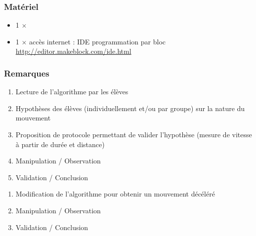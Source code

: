 \subsubsection{Matériel}
\begin{itemize}

   
    \item 1 $\times$ \matosMbot
   \item 1 $\times$ accès internet : IDE programmation par bloc \url{http://editor.makeblock.com/ide.html}
\end{itemize}

\subsubsection{Remarques}

\begin{minipage}[t]{0.5\linewidth}
\begin{methode}
    \begin{enumerate}
        \item Lecture de l'algorithme par les élèves
        \item Hypothèses des élèves (individuellement et/ou par groupe) sur la nature du mouvement
        \item Proposition de protocole permettant de valider l'hypothèse (mesure de vitesse à partir de durée et distance)
        \item Manipulation / Observation
        \item Validation / Conclusion
    \end{enumerate}
\end{methode}
\end{minipage}
\hfill
\begin{minipage}[t]{0.5\linewidth}
\begin{methode}
    \begin{enumerate}
        \item Modification de l'algorithme pour obtenir un mouvement décéléré
        \item Manipulation / Observation
        \item Validation / Conclusion
    \end{enumerate}
\end{methode}
\end{minipage}

%
%

\newpage

